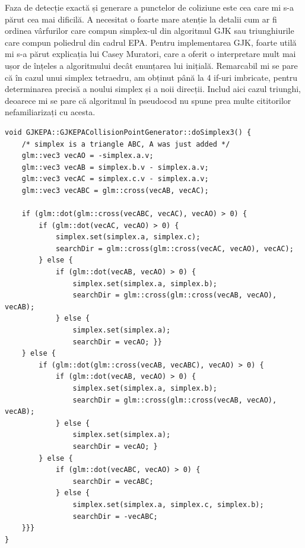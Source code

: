 \documentclass[12pt,a4paper]{report}
\begin{document}
Faza de detecție exactă și generare a punctelor de coliziune este cea care mi s-a părut cea mai dificilă. A necesitat o foarte mare atenție la detalii cum ar fi ordinea vârfurilor care compun simplex-ul din algoritmul GJK sau triunghiurile care compun poliedrul din cadrul EPA. Pentru implementarea GJK, foarte utilă mi s-a părut explicația lui Casey Muratori\cite{gjk_muratori}, care a oferit o interpretare mult mai ușor de înțeles a algoritmului decât enunțarea lui inițială\cite{gjk_original}. Remarcabil mi se pare că în cazul unui simplex tetraedru, am obținut până la 4 if-uri imbricate, pentru determinarea precisă a noului simplex și a noii direcții. Includ aici cazul triunghi, deoarece mi se pare că algoritmul în pseudocod nu spune prea multe cititorilor nefamiliarizați cu acesta.

\begin{lstlisting}[style=myC++]
void GJKEPA::GJKEPACollisionPointGenerator::doSimplex3() {
	/* simplex is a triangle ABC, A was just added */
	glm::vec3 vecAO = -simplex.a.v;
	glm::vec3 vecAB = simplex.b.v - simplex.a.v;
	glm::vec3 vecAC = simplex.c.v - simplex.a.v;
	glm::vec3 vecABC = glm::cross(vecAB, vecAC);

	if (glm::dot(glm::cross(vecABC, vecAC), vecAO) > 0) {
		if (glm::dot(vecAC, vecAO) > 0) {
			simplex.set(simplex.a, simplex.c);
			searchDir = glm::cross(glm::cross(vecAC, vecAO), vecAC);
		} else {
			if (glm::dot(vecAB, vecAO) > 0) {
				simplex.set(simplex.a, simplex.b);
				searchDir = glm::cross(glm::cross(vecAB, vecAO), vecAB);
			} else {
				simplex.set(simplex.a);
				searchDir = vecAO; }}
	} else {
		if (glm::dot(glm::cross(vecAB, vecABC), vecAO) > 0) {
			if (glm::dot(vecAB, vecAO) > 0) {
				simplex.set(simplex.a, simplex.b);
				searchDir = glm::cross(glm::cross(vecAB, vecAO), vecAB);
			} else {
				simplex.set(simplex.a);
				searchDir = vecAO; }
		} else {
			if (glm::dot(vecABC, vecAO) > 0) {
				searchDir = vecABC;
			} else {
				simplex.set(simplex.a, simplex.c, simplex.b);
				searchDir = -vecABC;
	}}}
}
\end{lstlisting}
\end{document}
